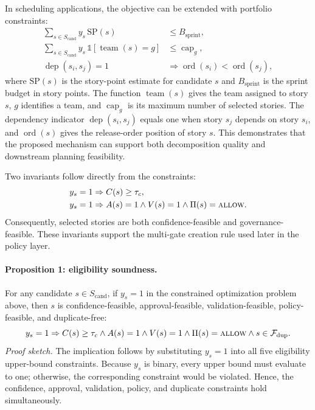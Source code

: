 \documentclass[manuscript,review]{acmart}
\begin{document}
In scheduling applications, the objective can be extended with portfolio constraints:
\begin{align}
\sum_{s \in S_{\text{cand}}} y_s\,\mathrm{SP}(s) &\leq B_{\text{sprint}}, \\
\sum_{s \in S_{\text{cand}}} y_s\,\mathbb{1}[\operatorname{team}(s)=g] &\leq \operatorname{cap}_g, \\
\operatorname{dep}(s_i,s_j)=1 &\Rightarrow \operatorname{ord}(s_i) < \operatorname{ord}(s_j),
\end{align}
where $\mathrm{SP}(s)$ is the story-point estimate for candidate $s$ and $B_{\text{sprint}}$ is the sprint budget in story points. The function $\operatorname{team}(s)$ gives the team assigned to story $s$, $g$ identifies a team, and $\operatorname{cap}_g$ is its maximum number of selected stories. The dependency indicator $\operatorname{dep}(s_i,s_j)$ equals one when story $s_j$ depends on story $s_i$, and $\operatorname{ord}(s)$ gives the release-order position of story $s$. This demonstrates that the proposed mechanism can support both decomposition quality and downstream planning feasibility.

Two invariants follow directly from the constraints:
\begin{align}
y_s=1 &\Rightarrow C(s)\ge\tau_c, \\
y_s=1 &\Rightarrow A(s)=1 \land V(s)=1 \land \Pi(s)=\textsc{allow}.
\end{align}
Consequently, selected stories are both confidence-feasible and governance-feasible. These invariants support the multi-gate creation rule used later in the policy layer.
\paragraph{Proposition 1: eligibility soundness.}
For any candidate $s\in S_{\text{cand}}$, if $y_s=1$ in the constrained optimization problem above, then $s$ is confidence-feasible, approval-feasible, validation-feasible, policy-feasible, and duplicate-free:
\begin{equation}
y_s=1 \Rightarrow
C(s)\ge\tau_c \land A(s)=1 \land V(s)=1 \land \Pi(s)=\textsc{allow} \land s\in\mathcal{F}_{\mathrm{dup}}.
\end{equation}
\textit{Proof sketch.}
The implication follows by substituting $y_s=1$ into all five eligibility upper-bound constraints. Because $y_s$ is binary, every upper bound must evaluate to one; otherwise, the corresponding constraint would be violated. Hence, the confidence, approval, validation, policy, and duplicate constraints hold simultaneously.
\end{document}

